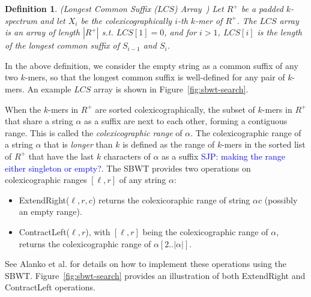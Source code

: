 \documentclass[unnumsec,webpdf,contemporary,large]{oup-authoring-template}%
\theoremstyle{thmstyleone}%
\theoremstyle{thmstyletwo}%
\theoremstyle{thmstylethree}%
\newtheorem{definition}{Definition}
\begin{document}
\begin{definition}\label{def:LCS-array}(Longest Common Suffix ($LCS$) Array~\cite{alanko2023longest})     
Let $R^+$ be a padded $k$-spectrum and let $X_i$ be the colexicographically $i$-th $k$-mer of $R^+$. 
The $LCS$ array is an array of length $|R^+|$ s.t. $LCS[1] = 0$, and for $i > 1$, $LCS[i]$ is the length of the longest common suffix of $S_{i-1}$ and $S_i$.
\end{definition}
 In the above definition, we consider the empty string as a common suffix of any two $k$-mers, so that the longest common suffix is well-defined for any pair of $k$-mers.
An example $LCS$ array is shown in Figure~\ref{fig:sbwt-search}.

When the $k$-mers in $R^+$ are sorted colexicographically, the subset of $k$-mers in $R^+$ that share a string $\alpha$ as a suffix are next to each other, forming a contiguous range. This is called the \emph{colexicographic range} of $\alpha$. The colexicographic range of a string $\alpha$ that is \emph{longer} than $k$ is defined as the range of $k$-mers in the sorted list of $R^+$ that have the last $k$ characters of $\alpha$ as a suffix \textcolor{blue}{SJP: making the range either singleton or empty?}. The SBWT provides two operations on colexicographic ranges $[\ell, r]$ of any string $\alpha$: 

\begin{itemize}
\item ExtendRight($\ell, r, c$) returns the colexicoraphic range of string $\alpha c$ (possibly an empty range).
\item ContractLeft($\ell, r$), with $[\ell, r]$ being the colexicographic range of $\alpha$, returns the colexicographic range of $\alpha[2..|\alpha|]$.
\end{itemize}

See Alanko et al. \cite{alanko2024finimizers} for details on how to implement these operations using the SBWT. Figure~\ref{fig:sbwt-search} provides an illustration of both ExtendRight and ContractLeft operations.

\end{document}
